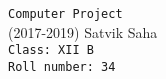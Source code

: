 \newfontfamily{}
\newfontfamily{}

\thispagestyle{empty}\addtocounter{page}{-1}
\hspace{0pt}
\begin{center}
\vfill
{\fontsize{36}{28}\tt Computer Project}\\
\vspace{1mm}
{\Perfograma (2017-2019)}
\vfill
{\fontsize{30}{24}\JennaSue Satvik Saha}\\
\vspace{1mm}
{\tt Class: XII B}\\
{\tt Roll number: 34}
\end{center}
\hspace{0pt}
